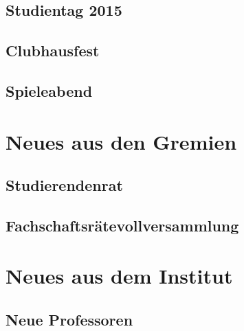 \documentclass[12pt, a4paper]{article}
\begin{document}
\subsection{Studientag 2015}


\subsection{Clubhausfest}


\subsection{Spieleabend}


\section{Neues aus den Gremien}

\subsection{Studierendenrat}

\subsection{Fachschaftsrätevollversammlung}

\section{Neues aus dem Institut}

\subsection{Neue Professoren}
\end{document}
